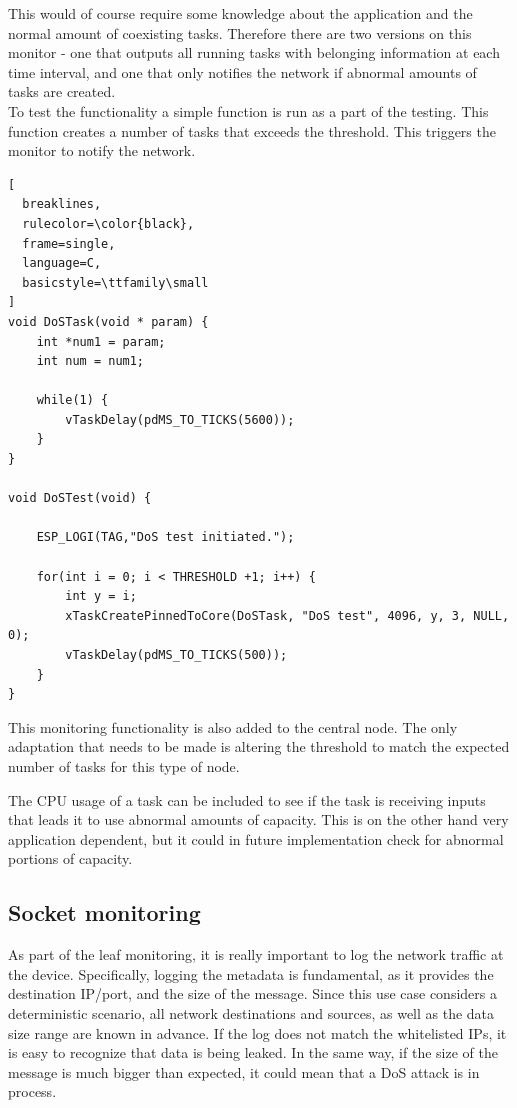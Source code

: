 This would of course require some knowledge about the application and the normal amount of coexisting tasks. Therefore there are two versions on this monitor - one that outputs all running tasks with belonging information at each time interval, and one that only notifies the network if abnormal amounts of tasks are created.\\

To test the functionality a simple function is run as a part of the testing. This function creates a number of tasks that exceeds the threshold. This triggers the monitor to notify the network. \\


\begin{lstlisting}[
  breaklines,
  rulecolor=\color{black},
  frame=single,
  language=C,
  basicstyle=\ttfamily\small
]
void DoSTask(void * param) {
    int *num1 = param;
    int num = num1;

    while(1) {
        vTaskDelay(pdMS_TO_TICKS(5600));
    }
}

void DoSTest(void) {

    ESP_LOGI(TAG,"DoS test initiated.");

    for(int i = 0; i < THRESHOLD +1; i++) {
        int y = i;
        xTaskCreatePinnedToCore(DoSTask, "DoS test", 4096, y, 3, NULL, 0);
        vTaskDelay(pdMS_TO_TICKS(500));
    }
}
\end{lstlisting}

This monitoring functionality is also added to the central node. The only adaptation that needs to be made is altering the threshold to match the expected number of tasks for this type of node.

The CPU usage of a task can be included to see if the task is receiving inputs that leads it to use abnormal amounts of capacity. This is on the other hand very application dependent, but it could in future implementation check for abnormal portions of capacity. 

\subsection{Socket monitoring}
As part of the leaf monitoring, it is really important to log the network traffic at the device. Specifically, logging the metadata is fundamental, as it provides the destination IP/port, and the size of the message. Since this use case considers a deterministic scenario, all network destinations and sources, as well as the data size range are known in advance. If the log does not match the whitelisted IPs, it is easy to recognize that data is being leaked. In the same way, if the size of the message is much bigger than expected, it could mean that a DoS attack is in process.\\

